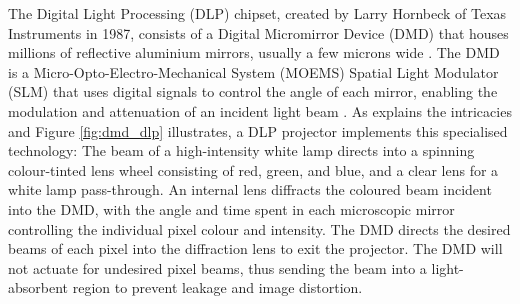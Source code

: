 The Digital Light Processing (DLP) chipset, created by Larry Hornbeck of Texas Instruments in 1987, consists of a Digital Micromirror Device (DMD) that houses millions of reflective aluminium mirrors, usually a few microns wide \cite{DigitalLightProcessing2024, HowDoesDLP}. The DMD is a Micro-Opto-Electro-Mechanical System (MOEMS) Spatial Light Modulator (SLM) that uses digital signals to control the angle of each mirror, enabling the modulation and attenuation of an incident light beam \cite{DLP4500DigitalMicromirror}. As \cite{HowDLPProjector} explains the intricacies and Figure \ref{fig:dmd_dlp} illustrates, a DLP projector implements this specialised technology: The beam of a high-intensity white lamp directs into a spinning colour-tinted lens wheel consisting of red, green, and blue, and a clear lens for a white lamp pass-through. An internal lens diffracts the coloured beam incident into the DMD, with the angle and time spent in each microscopic mirror controlling the individual pixel colour and intensity. The DMD directs the desired beams of each pixel into the diffraction lens to exit the projector. The DMD will not actuate for undesired pixel beams, thus sending the beam into a light-absorbent region to prevent leakage and image distortion.

